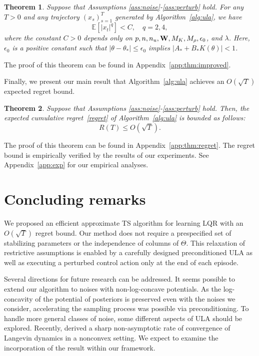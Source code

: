 \documentclass[11pt]{article}
\theoremstyle{plain}
\newtheorem{thm}{Theorem}[section]
\theoremstyle{definition}
\theoremstyle{remark}
\begin{document}
\begin{thm}\label{thm:improved}
Suppose that Assumptions \ref{ass:noise}-\ref{ass:perturb} hold.
For any $T > 0$ and any trajectory $(x_s)_{s=1}^T$ generated by Algorithm~\ref{alg:ula}, we have
\[
\mathbb{E} [|x_t|^q ] < C, \quad q = 2, 4,
\]
where  the constant $C >0$ depends only on $p, n, n_u, \bold{W}, M_K, M_\rho, \epsilon_0$, and $\lambda$. {Here, $\epsilon_0$ is a positive constant such that $|\theta - \theta_*| \leq \epsilon_0$ implies $|A_* + B_* K(\theta)| < 1$.} 
\end{thm}

The proof of this theorem can be found in Appendix~\ref{app:thm:improved}.


Finally, we present our main result that Algorithm~\ref{alg:ula} achieves an $O(\sqrt{T})$ expected regret bound. 

\begin{thm}\label{thm:regret}
Suppose that Assumptions \ref{ass:noise}-\ref{ass:perturb} hold. Then, the expected cumulative regret~\eqref{regret} of Algorithm~\ref{alg:ula} is bounded as follows:
\[
R(T) \leq O(\sqrt{T}).
\]
\end{thm}
The proof of this theorem can be found in Appendix~\ref{app:thm:regret}.
The regret bound is empirically verified by the results of our experiments. See Appendix~\ref{app:exp} for our empirical analyses.



\section{Concluding remarks}
We proposed an efficient approximate TS algorithm for learning LQR with an  $O(\sqrt{T})$ regret bound. Our method does not require a prespecified set of stabilizing parameters or the independence of columns of $\Theta$. 
This relaxation of restrictive assumptions is enabled by 
a carefully designed preconditioned ULA as well as executing a perturbed control action only at the end of each episode.

Several directions for future research can be addressed. 
It seems possible to extend our algorithm to noises with non-log-concave potentials. As the log-concavity of the potential of posteriors is preserved even with the noises we consider, accelerating the sampling process was possible via preconditioning. To handle more general classes of noise, some different aspects of ULA should be explored. Recently,  \cite{cheng2018sharp} derived a sharp non-asymptotic rate of convergence of Langevin dynamics in a nonconvex setting. We expect to examine the incorporation of the result within our framework. 
\end{document}
